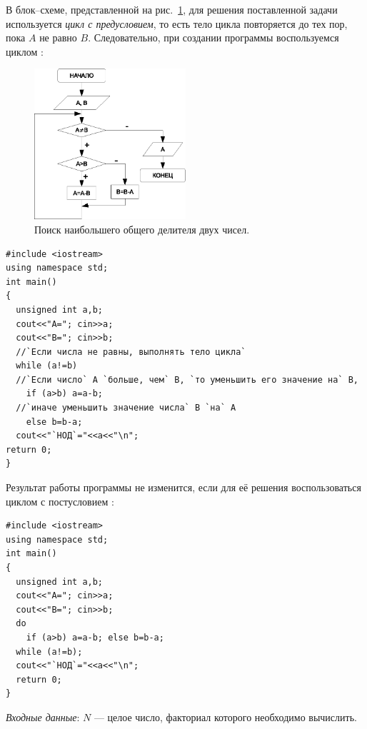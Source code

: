 В блок–схеме, представленной на рис.~\ref{ch03:refDrawing27}, для решения поставленной задачи используется
\emph{цикл с предусловием}, то есть тело цикла повторяется до тех пор, пока $A$ не равно
$B$. Следовательно, при создании программы воспользуемся циклом :

\begin{figure}[htb]
\begin{center}
\includegraphics[width=0.5\textwidth]{img/ris_3_28}
\caption{Поиск наибольшего общего делителя двух чисел.}
\label{ch03:refDrawing27}
\end{center}
\end{figure}

\begin{lstlisting}
#include <iostream>
using namespace std;
int main()
{
  unsigned int a,b;
  cout<<"A="; cin>>a;
  cout<<"B="; cin>>b;
  //`Если числа не равны, выполнять тело цикла`
  while (a!=b)
  //`Если число` A `больше, чем` B, `то уменьшить его значение на` B,
    if (a>b) a=a-b;
  //`иначе уменьшить значение числа` B `на` A
    else b=b-a;
  cout<<"`НОД`="<<a<<"\n";
return 0;
}
\end{lstlisting}

Результат работы программы не изменится, если для её решения воспользоваться циклом с постусловием
:

\begin{lstlisting}
#include <iostream>
using namespace std;
int main()
{
  unsigned int a,b;
  cout<<"A="; cin>>a;
  cout<<"B="; cin>>b;
  do
    if (a>b) a=a-b; else b=b-a;
  while (a!=b);
  cout<<"`НОД`="<<a<<"\n";
  return 0;
}
\end{lstlisting}


\emph{Входные данные}: $N$ --- целое число, факториал которого необходимо вычислить.

